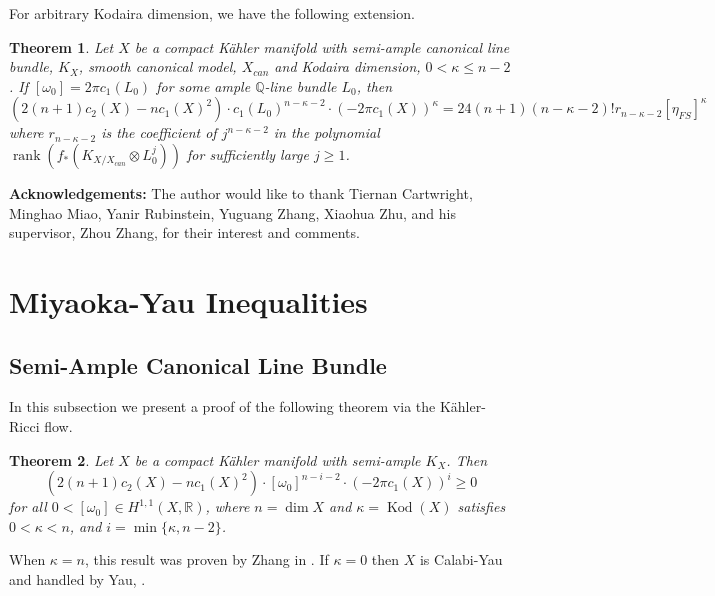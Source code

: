 \documentclass[12pt]{article}
\newtheorem{theorem}{Theorem}[section]
\numberwithin{equation}{section}
\newcommand{\R}{\mathbb{R}}
\newcommand{\Q}{\mathbb{Q}}
\DeclareMathOperator{\Kod}{Kod}
\DeclareMathOperator{\rank}{rank}
\begin{document}
\noindent For arbitrary Kodaira dimension, we have the following extension.

\begin{theorem}
Let $X$ be a compact K\"ahler manifold with semi-ample canonical line bundle, $K_X$, smooth canonical model, $X_{can}$ and Kodaira dimension, $0 < \kappa \leq n-2$. If $[\omega_0] = 2 \pi c_1(L_0)$ for some ample $\Q$-line bundle $L_0$, then
\begin{equation*}
    (2(n+1) c_2(X) - n c_1(X)^2) \cdot c_1(L_0)^{n-\kappa-2} \cdot (-2 \pi c_1(X))^\kappa = 24(n+1) (n-\kappa-2)! r_{n-\kappa-2} [\eta_{FS}]^\kappa
\end{equation*}
where $r_{n-\kappa-2}$ is the coefficient of $j^{n-\kappa-2}$ in the polynomial $\rank(f_*(K_{X/X_{can}} \otimes L_0^j))$ for sufficiently large $j \geq 1$.
\end{theorem}

\noindent \textbf{Acknowledgements:} The author would like to thank Tiernan Cartwright, Minghao Miao, Yanir Rubinstein, Yuguang Zhang, Xiaohua Zhu, and his supervisor, Zhou Zhang, for their interest and comments.

\section{Miyaoka-Yau Inequalities}

\subsection{Semi-Ample Canonical Line Bundle}

\noindent In this subsection we present a proof of the following theorem via the K\"ahler-Ricci flow.

\begin{theorem}\label{semi_ample_MY}
Let $X$ be a compact K\"ahler manifold with semi-ample $K_X$. Then
\begin{equation*}
    (2 (n+1) c_2(X) - n c_1(X)^2) \cdot [\omega_0]^{n-i-2} \cdot (-2\pi c_1(X))^{i} \geq 0
\end{equation*}
for all $0 < [\omega_0] \in H^{1,1}(X,\R)$, where $n = \dim X$ and $\kappa = \Kod(X)$ satisfies $0 < \kappa < n$, and $i = \min\{\kappa,n-2\}$.
\end{theorem}

\noindent When $\kappa = n$, this result was proven by Zhang in \cite{Z09}. If $\kappa = 0$ then $X$ is Calabi-Yau and handled by Yau, \cite{Y77,K14}.\\
\end{document}
